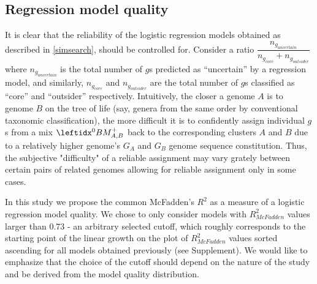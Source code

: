 \subsection{Regression model quality}
\label{regmodqual}
It is clear that the reliability of the logistic regression models obtained as
described in \ref{simsearch}, should be controlled for. Consider a ratio
$\dfrac{n_{g_{uncertain}}}{n_{g_{core}}+n_{g_{outsider}}}$ where
$n_{g_{uncertain}}$ is the total number of $g$s predicted as ``uncertain'' by a
regression model, and similarly, $n_{g_{core}}$ and $n_{g_{outsider}}$ are the
total number of $g$s classified as ``core'' and ``outsider'' respectively.
Intuitively, the closer a genome $A$ is to genome $B$ on the tree of life (say,
genera from the same order by conventional taxonomic classification), the more
difficult it is to confidently assign individual $g$s from a mix $\bmzpab$ back
to the corresponding clusters $A$ and $B$ due to a relatively higher genome's
$G_A$ and $G_B$ genome sequence constitution. Thus, the subjective "difficulty"
of a reliable assignment may vary grately between certain pairs of related
genomes allowing for reliable assignment only in some cases.

In this study we propose the common McFadden's $R^2$ \cite{McFadden1974} as a
measure of a logistic regression model quality. We chose to only consider
models with $R_{McFadden}^2$ values larger than 0.73 - an arbitrary selected
cutoff, which roughly corresponds to the starting point of the linear growth on
the plot of $R_{McFadden}^2$ values sorted ascending for all models obtained
previously (see Supplement). We would like to emphasize that the choice of the
cutoff should depend on the nature of the study and be derived from the model
quality distribution.
